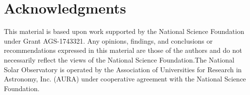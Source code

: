 \documentclass[]{article}
\begin{document}
\section*{Acknowledgments}
This material is based upon work supported by the National Science Foundation under Grant AGS-1743321. Any opinions, ﬁndings, and conclusions or recommendations expressed in this material are those of the authors and do not necessarily reﬂect the views of the National Science Foundation.The National Solar Observatory is operated by the Association of Universities for Research in Astronomy, Inc. (AURA)
under cooperative agreement with the National Science Foundation. 

\end{document}
